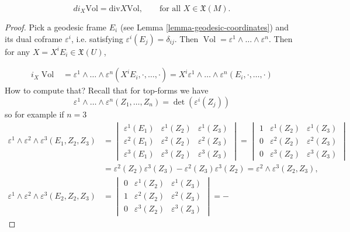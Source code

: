 \documentclass{book}
\begin{document}
\begin{lemma}
\label{lemma-divergence-and-volume}
\begin{equation}
\label{equation-divergence-and-volume}
di_X\text{Vol}=\text{div}X\text{Vol},\qquad
\text{for all }X\in \mathfrak{X}(M).
\end{equation}
\end{lemma}

\begin{proof}
Pick a geodesic frame $E_i$ (see Lemma
\ref{lemma-geodesic-coordinates}) and
its dual coframe $\varepsilon^i$, i.e.
satisfying
$\varepsilon^i(E_j)=\delta_{ij}$. Then
$\operatorname{Vol}=\varepsilon^1
\wedge \ldots \wedge \varepsilon^n$. Then for
any $X=X^iE_i \in
\mathfrak{X}(U)$,

$$
\begin{aligned}
i_X\operatorname{Vol}
&=
\varepsilon^1\wedge\ldots\wedge
\varepsilon^n(X^iE_i,\cdot,\ldots,\cdot)
=X^i\varepsilon^1\wedge\ldots\wedge
\varepsilon^n(E_i,\cdot,\ldots,\cdot)
\end{aligned}
$$
How to compute that? Recall that for
top-forms we have
$$
\varepsilon^1\wedge\ldots\wedge
\varepsilon^n(Z_1,\ldots,Z_n)
=\det(\varepsilon^i(Z_j))
$$
so for example if $n=3$
\begin{align*}\varepsilon^1\wedge
\varepsilon^2\wedge\varepsilon^3(E_1,Z_2,Z_3)
&=\begin{vmatrix}
\varepsilon^1(E_1)&\varepsilon^1(Z_2)
&\varepsilon^1(Z_3)\\
\varepsilon^2(E_1)&\varepsilon^2(Z_2)&
\varepsilon^2(Z_3)\\
\varepsilon^3(E_1)&\varepsilon^3(Z_2)&
\varepsilon^3(Z_3)
\end{vmatrix}
=\begin{vmatrix}
1&\varepsilon^1(Z_2) &\varepsilon^1(Z_3)\\
0&\varepsilon^2(Z_2)&\varepsilon^2(Z_3)\\
0&\varepsilon^3(Z_2)&\varepsilon^3(Z_3)
\end{vmatrix}\\
&=\varepsilon^2(Z_2)\varepsilon^3(Z_3)-
\varepsilon^2(Z_3)\varepsilon^3(Z_2)
=\varepsilon^2\wedge\varepsilon^3(Z_2,Z_3),\\
\varepsilon^1\wedge\varepsilon^2\wedge
\varepsilon^3(E_2,Z_2,Z_3)
&=\begin{vmatrix}
0&\varepsilon^1(Z_2) &\varepsilon^1(Z_3)\\
1&\varepsilon^2(Z_2)&\varepsilon^2(Z_3)\\
0&\varepsilon^3(Z_2)&\varepsilon^3(Z_3)
\end{vmatrix}=-

\end{align*}
\end{proof}
\end{document}
